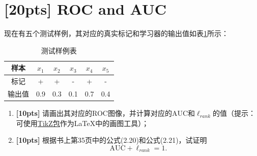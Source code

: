\documentclass[a4paper,UTF8]{article}
\numberwithin{equation}{section}
\begin{document}
\section{[20pts] ROC and AUC}
现在有五个测试样例，其对应的真实标记和学习器的输出值如表\ref{table:roc}所示：
\begin{table}[!h]
	\centering
	\caption{测试样例表} \vspace{2mm}\label{table:roc}
	\begin{tabular}{c|c c c c c}\hline
		样本 & $x_1$ & $x_2$ & $x_3$  & $x_4$  & $x_5$ \\
		\hline
		标记 & +  & + &  - &  +  & -\\
		\hline
		输出值 & 0.9  & 0.3 &  0.1 &  0.7  & 0.4\\
		\hline
	\end{tabular}
\end{table}
\begin{enumerate}[ {(}1{)}]
\item \textbf{[10pts]} 请画出其对应的ROC图像，并计算对应的$\mbox{AUC}$和$\ell_{rank}$的值（提示：可使用\href{https://en.wikibooks.org/wiki/LaTeX/PGF/TikZ}{TikZ包}作为\LaTeX 中的画图工具）；
\item \textbf{[10pts]} 根据书上第35页中的公式(2.20)和公式(2.21)，试证明\[\mbox{AUC}+\ell_{rank}=1.\]
\end{enumerate}
\end{document}
